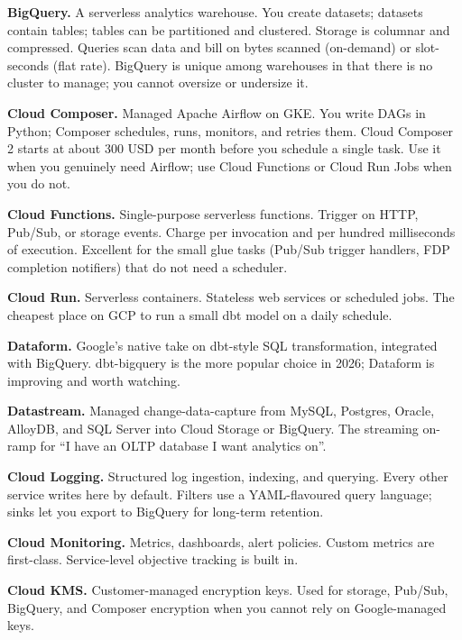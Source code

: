 \documentclass[
  11pt,
  british,
  oneside]{book}
\begin{document}
\textbf{BigQuery.} A serverless analytics warehouse. You
create datasets; datasets contain tables;
tables can be partitioned and clustered.
Storage is columnar and compressed. Queries scan data and bill on bytes
scanned (on-demand) or slot-seconds (flat rate).
BigQuery is unique among warehouses in that there is no cluster to
manage; you cannot oversize or undersize it.

\textbf{Cloud Composer.} Managed Apache
Airflow on GKE. You write DAGs in Python; Composer
schedules, runs, monitors, and retries them. Cloud Composer 2 starts at
about 300 USD per month before you schedule a single
task. Use it when you genuinely need Airflow;
use Cloud Functions or Cloud Run Jobs when you do
not.

\textbf{Cloud Functions.} Single-purpose
serverless functions. Trigger on HTTP, Pub/Sub, or storage events.
Charge per invocation and per hundred milliseconds of execution.
Excellent for the small glue tasks (Pub/Sub trigger handlers, FDP
completion notifiers) that do not need a scheduler.

\textbf{Cloud Run.} Serverless containers. Stateless
web services or scheduled jobs. The cheapest place on GCP to run a small
dbt model on a daily schedule.

\textbf{Dataform.} Google's native take on dbt-style SQL
transformation, integrated with BigQuery. dbt-bigquery is the more
popular choice in 2026; Dataform is improving and worth watching.

\textbf{Datastream.} Managed change-data-capture from
MySQL, Postgres, Oracle, AlloyDB, and SQL Server into Cloud Storage or
BigQuery. The streaming on-ramp for ``I have an OLTP database I want
analytics on''.

\textbf{Cloud Logging.} Structured log ingestion,
indexing, and querying. Every other service writes here by default.
Filters use a YAML-flavoured query language; sinks let you export to
BigQuery for long-term retention.

\textbf{Cloud Monitoring.} Metrics, dashboards,
alert policies. Custom metrics are first-class. Service-level objective
tracking is built in.

\textbf{Cloud KMS.} Customer-managed encryption keys.
Used for storage, Pub/Sub, BigQuery, and
Composer encryption when you cannot rely on Google-managed keys.
\end{document}
